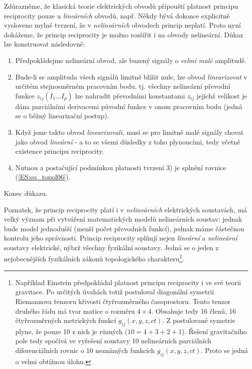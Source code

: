       Zdůrazněme, že klasická teorie elektrických obvodů připouští platnost principu reciprocity 
      pouze u \emph{lineárních} obvodů, např. Někdy bývá dokonce explicitně vysloveno mylné 
      tvrzení, že v \emph{nelineárních} obvodech princip neplatí. Proto nyní dokážeme, že princip 
      reciprocity je možno rozšířit i na obvody nelineární. Důkaz lze konstruovat následovně:
     
      
      \begin{enumerate} \addtolength{\itemsep}{-0.5\baselineskip}
        \item Předpokládejme nelineární obvod, ale buzený signály o \emph{velmi malé} amplitudě.
        \item Bude-li se amplituda všech signálů limitně blížit nule, lze obvod 
              \emph{linearizovat} v určitém stejnosměrném pracovním bodu, tj. všechny nelineární 
              převodní funkce \(z_{ij}(I_1\ldots I_p)\) lze nahradit převodními konstantami 
              \(z_{ij}\) jejichž velikost je dána parciálními derivacemi původní funkce v onom 
              pracovním bodu (jedná se o běžný linearizační postup).
        \item Když jsme takto obvod \emph{linearizovali}, musí se pro limitně malé signály chovat 
              jako obvod \emph{lineární} - a to se všemi důsledky z toho plynoucími, tedy včetně 
              existence principu reciprocity.
        \item Nutnou a postačující podmínkou platnosti tvrzení 3) je splnění rovnice 
              (\ref{ES:eq_topol06}).
      \end{enumerate}
      Konec důkazu.
      
      Poznatek, že princip reciprocity platí i v \emph{nelineárních} elektrických soustavách, má 
      velký význam při vytváření matematických modelů nelineárních soustav: jednak bude model 
      jednodušší (menší počet převodních funkcí), jednak máme částečnou kontrolu jeho správnosti. 
      Princip reciprocity splňují nejen \emph{lineární} a \emph{nelineární} soustavy elektrické, 
      nýbrž všechny fyzikální soustavy. Jedná se o jeden z nejobecnějších fyzikálních zákonů 
      topologického charakteru\footnote{Například Einstein předpokládal platnost principu 
      reciprocity i ve své teorii gravitace. Po určitých úvahách totiž postuloval diagonální 
      symetrii Riemannova tenzoru křivosti čtyřrozměrného časoprostoru. Tento tenzor druhého řádu 
      má tvar matice o rozměru \(4\times4\). Obsahuje tedy 16 členů, 16 čtyřrozměrných 
      metrických funkcí \(g_{ij}(x, y, z, ct)\). Z postulované symetrie plyne, že pouze 10 z nich 
      je různých (\(10 = 4+3+2+1\)). Řešení gravitačního pole tedy spočívá ve vyřešení soustavy 10 
      nelineárních parciálních diferenciálních rovnic o 10 neznámých funkcích \(g_{ij}(x, y, z, 
      ct)\). Proto se jedná o velmi obtížnou úlohu.}.
      
